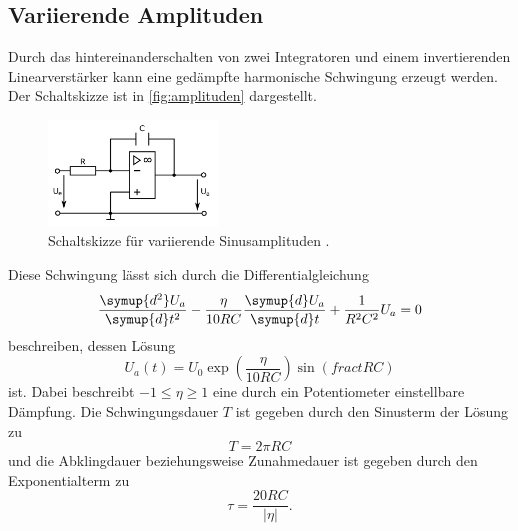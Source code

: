 \subsection{Variierende Amplituden}
Durch das hintereinanderschalten von zwei Integratoren und einem invertierenden Linearverstärker
kann eine gedämpfte harmonische Schwingung erzeugt werden. Der Schaltskizze ist in 
\autoref{fig:amplituden} dargestellt.
\begin{figure}[H]
    \centering
    \includegraphics[width=0.4\textwidth]{integrator.png}
    \caption{Schaltskizze für variierende Sinusamplituden \cite{anleitung}.}
    \label{fig:amplituden}
\end{figure}
Diese Schwingung lässt sich durch die Differentialgleichung
\begin{equation*}
    \frac{\symup{d^2} U_a}{\symup{d} t^2} - \frac{\eta}{10 R C} \frac{\symup{d} U_a}{\symup{d} t} + \frac{1}{R^2 C^2} U_a = 0
\end{equation*}
beschreiben, dessen Lösung 
\begin{equation*}
    U_a (t) = U_0 \exp \left( \frac{\eta}{10 R C} \right) \sin \left(frac{t}{R C} \right)
\end{equation*}
ist.
Dabei beschreibt $ -1 \leq \eta \geq 1 $ eine durch ein Potentiometer einstellbare Dämpfung.
Die Schwingungsdauer $T$ ist gegeben durch den Sinusterm der Lösung zu
\begin{equation*}
    T = 2 \pi R C
\end{equation*}
und die Abklingdauer beziehungsweise Zunahmedauer ist gegeben durch den Exponentialterm zu
\begin{equation*}
    \tau = \frac{20 R C}{\vert \eta \vert}.
\end{equation*}
